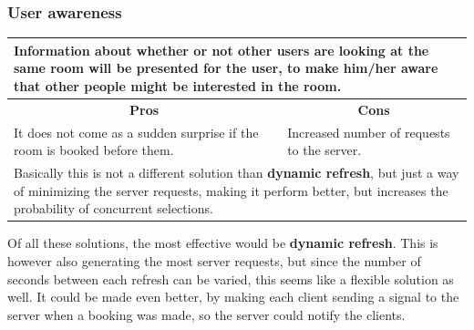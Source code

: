 \subsubsection*{User awareness}
\begin{tabular}{|p{6cm}|p{6cm}|}
\hline
	\multicolumn{2}{|p{12cm}|}{Information about whether or not other users are looking at the same room will be presented for the user, to make him/her aware that other people might be interested in the room. } \\ \hline \hline
	\multicolumn{1}{|c|}{\textbf{Pros}} & \multicolumn{1}{c|}{\textbf{Cons}} \\ \hline
	It does not come as a sudden surprise if the room is booked before them. & Increased number of requests to the server. \\ \hline
	\multicolumn{2}{|p{12cm}|}{Basically this is not a different solution than \textbf{dynamic refresh}, but just a way of minimizing the server requests, making it perform better, but increases the probability of concurrent selections.} \\
	\hline
\end{tabular}

Of all these solutions, the most effective would be \textbf{dynamic refresh}. This is however also generating the most server requests, but since the number of seconds between each refresh can be varied, this seems like a flexible solution as well. It could be made even better, by making each client sending a signal to the server when a booking was made, so the server could notify the clients.\\


